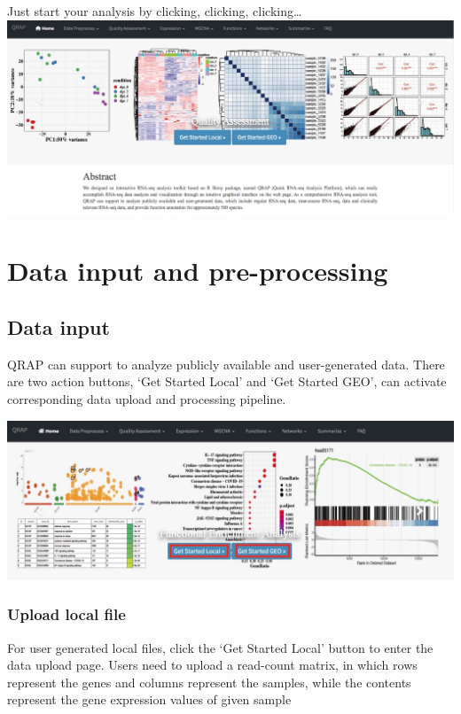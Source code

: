 \documentclass[
  a4paper,
  oneside]{book}
\begin{document}
Just start your analysis by clicking, clicking, clicking\ldots{}\\
\includegraphics{images/launch_interface.jpeg}\\

\hypertarget{data-input-and-pre-processing}{%
\chapter{Data input and pre-processing}\label{data-input-and-pre-processing}}

\hypertarget{data-input}{%
\section{Data input}\label{data-input}}

QRAP can support to analyze publicly available and user-generated data. There are two action buttons, `Get Started Local' and `Get Started GEO', can activate corresponding data upload and processing pipeline.

\includegraphics{images/start_button.jpeg}

\hypertarget{upload-local-file}{%
\subsection{Upload local file}\label{upload-local-file}}

For user generated local files, click the `Get Started Local' button to enter the data upload page. Users need to upload a read-count matrix, in which rows represent the genes and columns represent the samples, while the contents represent the gene expression values of given sample
\end{document}
